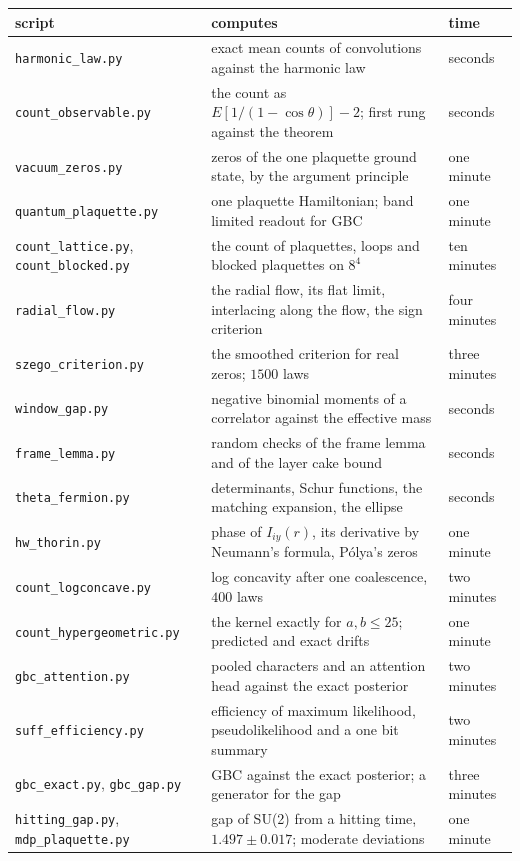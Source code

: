 \begin{center}
\footnotesize
\begin{tabular}{p{1.3in}p{2.05in}p{0.7in}}
\toprule
script & computes & time \\ \midrule
\texttt{harmonic\_law.py} & exact mean counts of convolutions against the harmonic law & seconds \\
{\scriptsize\texttt{count\_observable.py}} & the count as $E[1/(1-\cos\theta)]-2$; first rung against the theorem & seconds \\
\texttt{vacuum\_zeros.py} & zeros of the one plaquette ground state, by the argument principle & one minute \\
{\scriptsize\texttt{quantum\_plaquette.py}} & one plaquette Hamiltonian; band limited readout for GBC & one minute \\
\texttt{count\_lattice.py}, \texttt{count\_blocked.py} & the count of plaquettes, loops and blocked plaquettes on $8^4$ & ten minutes \\
\texttt{radial\_flow.py} & the radial flow, its flat limit, interlacing along the flow, the sign criterion & four minutes \\
{\scriptsize\texttt{szego\_criterion.py}} & the smoothed criterion for real zeros; $1500$ laws & three minutes \\
\texttt{window\_gap.py} & negative binomial moments of a correlator against the effective mass & seconds \\
\texttt{frame\_lemma.py} & random checks of the frame lemma and of the layer cake bound & seconds \\
\texttt{theta\_fermion.py} & determinants, Schur functions, the matching expansion, the ellipse & seconds \\
\texttt{hw\_thorin.py} & phase of $I_{iy}(r)$, its derivative by Neumann's formula, P\'olya's zeros & one minute \\
{\scriptsize\texttt{count\_logconcave.py}} & log concavity after one coalescence, $400$ laws & two minutes \\
{\tiny\texttt{count\_hypergeometric.py}} & the kernel exactly for $a,b\le25$; predicted and exact drifts & one minute \\
\texttt{gbc\_attention.py} & pooled characters and an attention head against the exact posterior & two minutes \\
\texttt{suff\_efficiency.py} & efficiency of maximum likelihood, pseudolikelihood and a one bit summary & two minutes \\
\texttt{gbc\_exact.py}, \texttt{gbc\_gap.py} & GBC against the exact posterior; a generator for the gap & three minutes \\
\texttt{hitting\_gap.py}, \texttt{mdp\_plaquette.py} & gap of SU(2) from a hitting time, $1.497\pm0.017$; moderate deviations & one minute \\
\bottomrule
\end{tabular}
\end{center}


